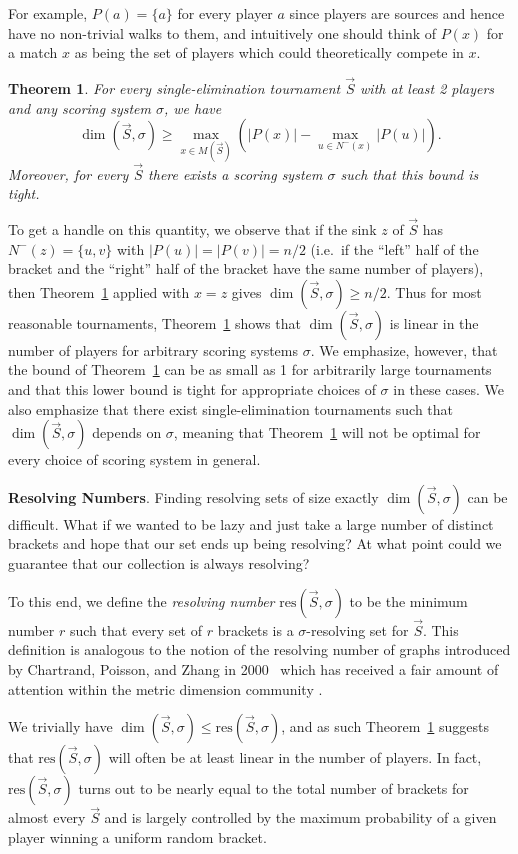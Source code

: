 \documentclass[12pt,letterpaper]{article}
\newtheorem{thm}{Theorem}[section]
\theoremstyle{definition}
\newcommand{\sig}{\sigma}
\renewcommand{\1}{\mathbbm{1}}
\newcommand{\tour}{\vec{S}}
\newcommand{\res}{\mathrm{res}}
\begin{document}
For example, $P(a)=\{a\}$ for every player $a$ since players are sources and hence have no non-trivial walks to them, and intuitively one should think of $P(x)$ for a match $x$ as being the set of players which could theoretically compete in $x$.
\begin{thm}\label{lower bound}
	For every single-elimination tournament $\tour$ with at least 2 players and any scoring system $\sig$, we have
	\[\dim(\tour,\sig)\ge \max_{x\in M(\tour)}\left( |P(x)|-\max_{u\in N^-(x)} |P(u)|\right).\]
	Moreover, for every $\tour$ there exists a scoring system $\sig$ such that this bound is tight.
\end{thm}

To get a handle on this quantity, we observe that if the sink $z$ of $\tour$ has $N^-(z)=\{u,v\}$ with $|P(u)|=|P(v)|=n/2$ (i.e.\ if the ``left'' half of the bracket and the ``right'' half of the bracket have the same number of players), then Theorem~\ref{lower bound} applied with $x=z$ gives $\dim(\tour,\sig)\ge n/2$.  Thus for most reasonable tournaments, Theorem~\ref{lower bound} shows that $\dim(\tour,\sig)$ is linear in the number of players for arbitrary scoring systems $\sig$.  We emphasize, however, that the bound of Theorem~\ref{lower bound} can be as small as 1 for arbitrarily large tournaments and that this lower bound is tight for appropriate choices of $\sig$ in these cases.  We also emphasize that there exist single-elimination tournaments such that $\dim(\tour,\sig)$ depends on $\sig$, meaning that Theorem~\ref{lower bound} will not be optimal for every choice of scoring system in general. 

\textbf{Resolving Numbers}.  Finding resolving sets of size exactly $\dim(\tour,\sig)$ can be difficult.  What if we wanted to be lazy and just take a large number of distinct brackets and hope that our set ends up being resolving?  At what point could we guarantee that our collection is always resolving?

To this end, we define the \textit{resolving number} $\res(\tour,\sig)$ to be the minimum number $r$ such that every set of $r$ brackets is a $\sig$-resolving set for $\tour$.  This definition is analogous to the notion of the resolving number of graphs introduced by Chartrand, Poisson, and Zhang in 2000~\cite{chartrand2000resolvability} which has received a fair amount of attention within the metric dimension community \cite{garijo2013metric,garijo2013resolving,tennenhouse2015new}.  

We trivially have $\dim(\tour,\sig)\le \res(\tour,\sig)$, and as such Theorem~\ref{lower bound} suggests that $\res(\tour,\sig)$ will often be at least linear in the number of players.  In fact, $\res(\tour,\sig)$ turns out to be nearly equal to the total number of brackets for almost every $\tour$ and is largely controlled by the maximum probability of a given player winning a uniform random bracket.
\end{document}
